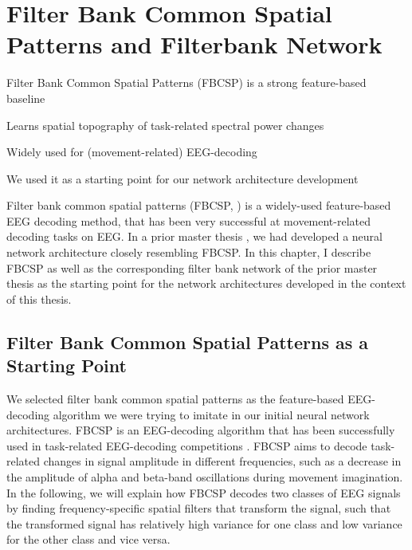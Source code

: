 \chapter{Filter Bank Common Spatial Patterns and
Filterbank Network}\label{fbscp-and-filterbank-net}

\begin{startbox}{Filter Bank Common Spatial Patterns (FBCSP) is a strong feature-based baseline}
\item Learns spatial topography of task-related spectral power changes
\item Widely used for (movement-related) EEG-decoding
\item We used it as a starting point for our network architecture development
\end{startbox}



    Filter bank common spatial patterns (FBCSP, \cite{ang_filter_2008,chin_multi-class_2009}) is a widely-used  feature-based EEG decoding method, that has been very successful at movement-related decoding tasks on EEG. In a prior master thesis
\citep{schirrmeister_msc_thesis_2015}, we had developed a
neural network architecture closely resembling FBCSP. In this chapter,
I describe FBCSP as well as the
corresponding filter bank network of the prior master thesis as the
starting point for the network architectures developed in the context of
this thesis.

\section{Filter Bank Common Spatial Patterns as a Starting
Point}\label{filter-bank-common-spatial-patterns-as-a-starting-point}


We selected filter bank common spatial patterns 
\cite{ang_filter_2008,chin_multi-class_2009} as the
feature-based EEG-decoding algorithm we were trying to imitate in our
initial neural network architectures. FBCSP is an EEG-decoding algorithm
that has been successfully used in task-related EEG-decoding
competitions \cite{tangermann_review_2012}. FBCSP aims to
decode task-related changes in signal amplitude in different
frequencies, such as a decrease in the amplitude of alpha and beta-band
oscillations during movement imagination. In the following, we will
explain how FBCSP decodes two classes of EEG signals by finding
frequency-specific spatial filters that transform the signal, such that
the transformed signal has relatively high variance for one class and low variance for the
other class and vice versa.


